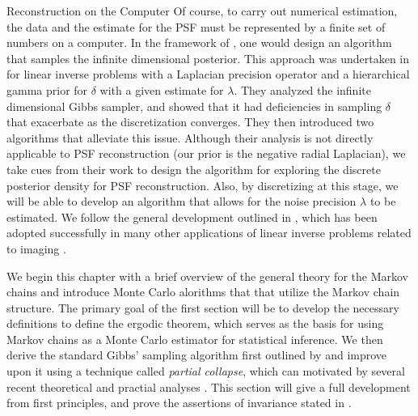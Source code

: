\begin{chapter}{Reconstruction on the Computer}
Of course, to carry out numerical estimation, the data and the estimate for the PSF must be represented by a finite set of numbers on a computer.
In the framework of \citep{stuart2010}, one would design an algorithm that samples the infinite dimensional posterior. 
This approach was undertaken in \citep{agapiou2014analysis} for linear inverse problems with a Laplacian precision operator and a hierarchical gamma prior for $\delta$ with a given estimate for $\lambda$. 
They analyzed the infinite dimensional Gibbs sampler, and showed that it had deficiencies in sampling $\delta$ that exacerbate as the discretization converges.
They then introduced two algorithms that alleviate this issue.
Although their analysis is not directly applicable to PSF reconstruction (our prior is the negative radial Laplacian), we take cues from their work to design the algorithm for exploring the discrete posterior density for PSF reconstruction.
Also, by discretizing at this stage, we will be able to develop an algorithm that allows for the noise precision $\lambda$ to be estimated.
We follow the general development outlined in \citep{bardsley2012mcmc}, which has been adopted successfully in many other applications of linear inverse problems related to imaging \citep{howard2016bayesian,bardsley2016metropolis,fowler2016stochastic,bardsley2015dealing,bardsley2013efficient}.

We begin this chapter with a brief overview of the general theory for the Markov chains and introduce Monte Carlo alorithms that that utilize the Markov chain structure.
The primary goal of the first section will be to develop the necessary definitions to define the ergodic theorem, which serves as the basis for using Markov chains as a Monte Carlo estimator for statistical inference.
We then derive the standard Gibbs' sampling algorithm first outlined by \citep{geman1984stochastic} and improve upon it using a technique called \emph{partial collapse}, which can motivated by several recent theoretical and practial analyses \citep{van2008partially,agapiou2014analysis,fox2015fast}.
This section will give a full development from first principles, and prove the assertions of invariance stated in \citep{van2008partially}.


\end{chapter}
